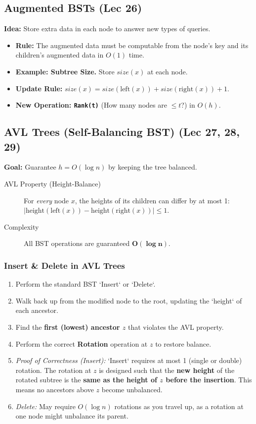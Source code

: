 \subsection{Augmented BSTs (Lec 26)}
\textbf{Idea:} Store extra data in each node to answer new types of queries.
\begin{itemize}
    \item \textbf{Rule:} The augmented data must be computable from the node's key and its children's augmented data in $O(1)$ time.
    \item \textbf{Example: Subtree Size.} Store $size(x)$ at each node.
    \item \textbf{Update Rule:} $size(x) = size(\text{left}(x)) + size(\text{right}(x)) + 1$.
    \item \textbf{New Operation: \texttt{Rank(t)}} (How many nodes are $\le t$?) in $O(h)$.
\end{itemize}

\subsection{AVL Trees (Self-Balancing BST) (Lec 27, 28, 29)}
\textbf{Goal:} Guarantee $h = O(\log n)$ by keeping the tree balanced.
\begin{description}
    \item[AVL Property (Height-Balance)] For \textit{every} node $x$, the heights of its children can differ by at most 1:
    $|\text{height}(\text{left}(x)) - \text{height}(\text{right}(x))| \le 1$.
    \item[Complexity] All BST operations are guaranteed $\mathbf{O(\log n)}$.
\end{description}

\subsubsection{Insert \& Delete in AVL Trees}
\begin{enumerate}
    \item Perform the standard BST `Insert` or `Delete`.
    \item Walk back up from the modified node to the root, updating the `height` of each ancestor.
    \item Find the \textbf{first (lowest) ancestor $z$} that violates the AVL property.
    \item Perform the correct \textbf{Rotation} operation at $z$ to restore balance.
    \item \textit{Proof of Correctness (Insert):} `Insert` requires at most 1 (single or double) rotation. The rotation at $z$ is designed such that the \textbf{new height} of the rotated subtree is the \textbf{same as the height of $z$ before the insertion}. This means no ancestors above $z$ become unbalanced.
    \item \textit{Delete:} May require $O(\log n)$ rotations as you travel up, as a rotation at one node might unbalance its parent.
\end{enumerate}

